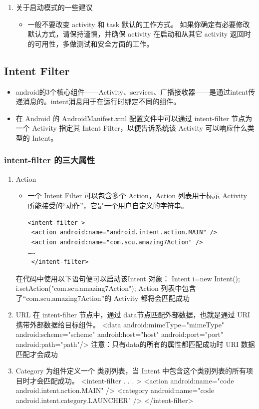 \documentclass[9pt, b5paper]{article}
\begin{document}
\begin{enumerate}
\begin{enumerate}
\begin{itemize}
\begin{itemize}
\end{itemize}
\end{itemize}
\item 关于启动模式的一些建议
\label{sec-1-3-3-2-2}
\begin{itemize}
\item 一般不要改变 activity 和 task 默认的工作方式。 如果你确定有必要修改默认方式，请保持谨慎，并确保 activity 在启动和从其它 activity 返回时的可用性，多做测试和安全方面的工作。
\end{itemize}
\end{enumerate}
\end{enumerate}
\subsection{Intent Filter}
\label{sec-1-4}
\begin{itemize}
\item android的3个核心组件——Activity、services、广播接收器——是通过intent传递消息的。intent消息用于在运行时绑定不同的组件。
\item 在 Android 的 AndroidManifest.xml 配置文件中可以通过 intent-filter 节点为一个 Activity 指定其 Intent Filter，以便告诉系统该 Activity 可以响应什么类型的 Intent。
\end{itemize}
\subsubsection{intent-filter 的三大属性}
\label{sec-1-4-1}
\begin{enumerate}
\item Action
\label{sec-1-4-1-1}
\begin{itemize}
\item 一个 Intent Filter 可以包含多个 Action，Action 列表用于标示 Activity 所能接受的“动作”，它是一个用户自定义的字符串。
\begin{verbatim}
<intent-filter > 
 <action android:name="android.intent.action.MAIN" /> 
 <action android:name="com.scu.amazing7Action" /> 
……
 </intent-filter>
\end{verbatim}
\end{itemize}
在代码中使用以下语句便可以启动该Intent 对象：
Intent i=new Intent(); 
i.setAction("com.scu.amazing7Action");
Action 列表中包含了“com.scu.amazing7Action”的 Activity 都将会匹配成功
\item URL
\label{sec-1-4-1-2}
在 intent-filter 节点中，通过 data节点匹配外部数据，也就是通过 URI 携带外部数据给目标组件。
<data android:mimeType="mimeType" 
    android:scheme="scheme" 
     android:host="host"
     android:port="port" 
     android:path="path"/>
注意：只有data的所有的属性都匹配成功时 URI 数据匹配才会成功
\item Category
\label{sec-1-4-1-3}
为组件定义一个 类别列表，当 Intent 中包含这个类别列表的所有项目时才会匹配成功。
<intent-filter . . . >
   <action android:name="code android.intent.action.MAIN" />
   <category android:name="code　android.intent.category.LAUNCHER" />
</intent-filter>
\end{enumerate}
\end{document}

